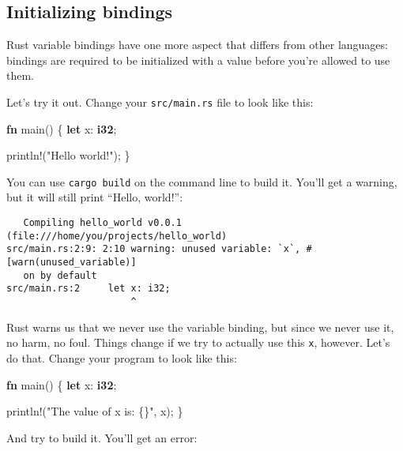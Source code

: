 \documentclass[a4paper,]{book}
\newenvironment{Shaded}{\begin{snugshade}}{\end{snugshade}}
\newcommand{\KeywordTok}[1]{\textcolor[rgb]{0.13,0.29,0.53}{\textbf{{#1}}}}
\newcommand{\StringTok}[1]{\textcolor[rgb]{0.31,0.60,0.02}{{#1}}}
\newcommand{\OtherTok}[1]{\textcolor[rgb]{0.56,0.35,0.01}{{#1}}}
\newcommand{\NormalTok}[1]{{#1}}
\begin{document}
\subsection{Initializing bindings}\label{initializing-bindings}

Rust variable bindings have one more aspect that differs from other
languages: bindings are required to be initialized with a value before
you're allowed to use them.

Let's try it out. Change your \texttt{src/main.rs} file to look like
this:

\begin{Shaded}
\begin{Highlighting}[]
\KeywordTok{fn} \NormalTok{main() \{}
    \KeywordTok{let} \NormalTok{x: }\KeywordTok{i32}\NormalTok{;}

    \OtherTok{println!}\NormalTok{(}\StringTok{"Hello world!"}\NormalTok{);}
\NormalTok{\}}
\end{Highlighting}
\end{Shaded}

You can use \texttt{cargo\ build} on the command line to build it.
You'll get a warning, but it will still print ``Hello, world!'':

\begin{verbatim}
   Compiling hello_world v0.0.1 (file:///home/you/projects/hello_world)
src/main.rs:2:9: 2:10 warning: unused variable: `x`, #[warn(unused_variable)]
   on by default
src/main.rs:2     let x: i32;
                      ^
\end{verbatim}

Rust warns us that we never use the variable binding, but since we never
use it, no harm, no foul. Things change if we try to actually use this
\texttt{x}, however. Let's do that. Change your program to look like
this:

\begin{Shaded}
\begin{Highlighting}[]
\KeywordTok{fn} \NormalTok{main() \{}
    \KeywordTok{let} \NormalTok{x: }\KeywordTok{i32}\NormalTok{;}

    \OtherTok{println!}\NormalTok{(}\StringTok{"The value of x is: \{\}"}\NormalTok{, x);}
\NormalTok{\}}
\end{Highlighting}
\end{Shaded}

And try to build it. You'll get an error:
\end{document}

